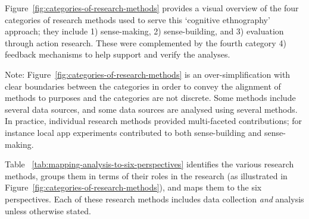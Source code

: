  Figure~\ref{fig:categories-of-research-methods} provides a visual overview of the four categories of research methods used to serve this `cognitive ethnography' approach; they include 1) sense-making, 2) sense-building, and 3) evaluation through action research. These were complemented by the fourth category 4) feedback mechanisms to help support and verify the analyses. 

Note: Figure~\ref{fig:categories-of-research-methods} is an over-simplification with clear boundaries between the categories in order to convey the alignment of methods to purposes and the categories are not discrete.  Some methods include several data sources, and some data sources are analysed using several methods. In practice, individual research methods provided multi-faceted contributions; for instance local app experiments contributed to both sense-building and sense-making. 

\medskip


Table ~\ref{tab:mapping-analysis-to-six-perspectives} identifies the various research methods, groups them in terms of their roles in the research (as illustrated in Figure~\ref{fig:categories-of-research-methods}), and maps them to the six perspectives.  Each of these research methods includes data collection \textit{and} analysis unless otherwise stated.


